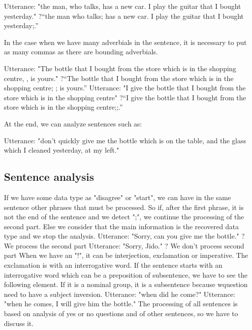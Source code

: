 \documentclass[twoside,a4paper,10pt]{report}
\begin{document}
\small
\begin{verbatimtab}
  Utterance: "the man, who talks, has a new car. I play the guitar that I bought yesterday."
  ?“the man who talks; has a new car. I play the guitar that I bought yesterday;.”
\end{verbatimtab}
\normalsize
In the case when we have many adverbials in the sentence, it is necessary to put as many commas as there are bounding adverbials.


\small
\begin{verbatimtab}
  Utterance: "The bottle that I bought from the store which is in the shopping centre, , is yours."
  ?“The bottle that I bought from the store which is in the shopping centre; ; is yours.”
  Utterance: "I give the bottle that I bought from the store which is in the shopping centre"
  ?“I give the bottle that I bought from the store which is in the shopping centre;;.” 
\end{verbatimtab}
\normalsize
At the end, we can analyze sentences such as:


\small
\begin{verbatimtab}
  Utterance: "don't quickly give me the bottle which is on the table, and the glass which I cleaned
yesterday, at my left."
\end{verbatimtab}
\normalsize

\subsection{Sentence analysis}
\label{32c0b571d3057222f6d267b69785af3c}%
If we have some data type as "disagree" or "start", we can have in the same sentence other phrases that must be processed. So if, after the first phrase, it is not the end of the sentence and we detect ";", we continue the processing of the second part. Else we consider that the main information is the recovered data type and we stop the analysis.
Utterance: "Sorry, can you give me the bottle." ? We process the second part
Utterance: "Sorry, Jido." ? We don't process second part
When we have an "!", it can be interjection, exclamation or imperative. The exclamation is with an interrogative word.
If the sentence starts with an interrogative word which can be a preposition of subsentence, we have to see the following element. If it is a nominal group, it is a subsentence because w{\textunderscore}question need to have a subject inversion.
Utterance: "when did he come?"
Utterance: "when he comes, I will give him the bottle."
The processing of all sentences is based on analysis of yes or no questions and of other sentences, so we have to discuss it.
\end{document}
